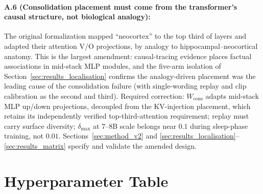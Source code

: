 \paragraph{A.6 (Consolidation placement must come from the transformer's causal structure, not biological analogy):} The original formalization mapped ``neocortex'' to the top third of layers and adapted their attention V/O projections, by analogy to hippocampal--neocortical anatomy. This is the largest amendment: causal-tracing evidence places factual associations in mid-stack MLP modules, and the five-arm isolation of Section~\ref{sec:results_localisation} confirms the analogy-driven placement was the leading cause of the consolidation failure (with single-wording replay and clip calibration as the second and third). Required correction: $W_{\mathrm{cons}}$ adapts mid-stack MLP up/down projections, decoupled from the KV-injection placement, which retains its independently verified top-third-attention requirement; replay must carry surface diversity; $\delta_{\max}$ at 7--8B scale belongs near $0.1$ during sleep-phase training, not $0.01$. Sections~\ref{sec:method_v2} and \ref{sec:results_localisation}--\ref{sec:results_matrix} specify and validate the amended design.

\section{Hyperparameter Table}
\label{app:hyperparams}


